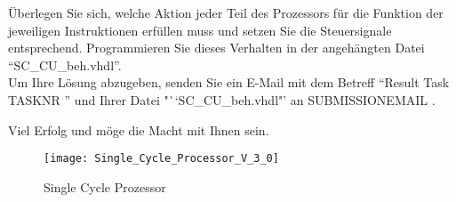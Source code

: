 \documentclass[a4paper,12pt]{article}
\begin{document}
\"Uberlegen Sie sich, welche Aktion jeder Teil des Prozessors f\"ur die Funktion der jeweiligen Instruktionen erf\"ullen muss und setzen Sie die Steuersignale entsprechend. Programmieren Sie dieses Verhalten in der angeh\"angten Datei "`SC\_CU\_beh.vhdl"'.\\

Um Ihre L\"osung abzugeben, senden Sie ein E-Mail mit dem Betreff "`Result Task {{ TASKNR }}"' und Ihrer Datei "``SC\_CU\_beh.vhdl"'  an {{ SUBMISSIONEMAIL }}.

\vspace{0.5cm}

Viel Erfolg und m\"oge die Macht mit Ihnen sein.

\begin{landscape}
\begin{figure}[!h]
\vspace{-0.5cm}
\hspace{-1.8cm}
\texttt{[image: Single\_Cycle\_Processor\_V\_3\_0]}
\caption{Single Cycle Prozessor}
\label{fig:SingleCycleProcessor}
\end{figure}
\end{landscape}
\end{document}
